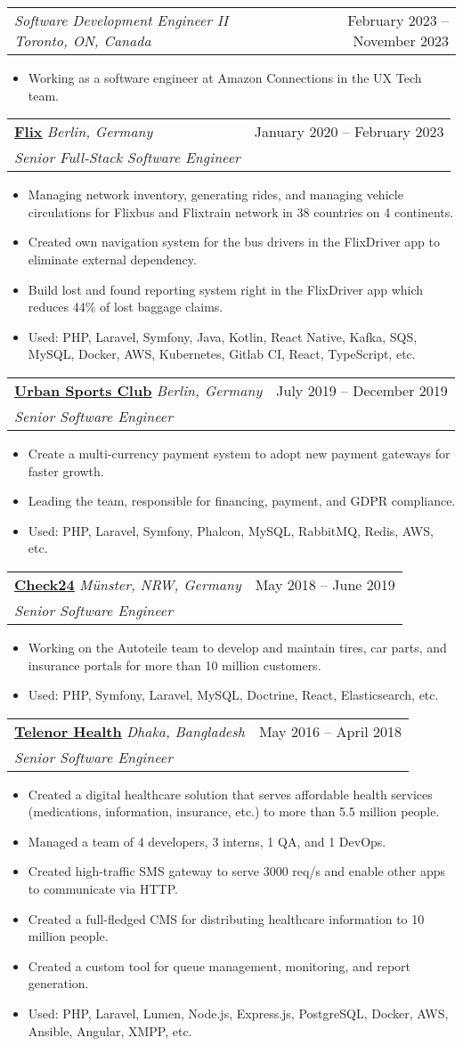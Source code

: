 \documentclass[a4paper,11pt]{article}
\makeatletter
\newcommand{\resumeItem}[1]{
  \item\small{
    {#1 \vspace{-2pt}}
  }
}
\newcommand{\resumeSubheading}[4]{
  \vspace{-2pt}\item
    \begin{tabular*}{0.97\textwidth}[t]{l@{\extracolsep{\fill}}r}
      \textbf{\large{#1}} \small{\textit{#4}} & #2 \\
      \textsl{#3}
    \end{tabular*}\vspace{-7pt}
}
\newcommand{\resumeSubSubheading}[2]{
    \vspace{-2pt}\item
    \begin{tabular*}{0.97\textwidth}{l@{\extracolsep{\fill}}r}
      \textsl{#1} & #2 \\
    \end{tabular*}\vspace{-7pt}
}
\newcommand{\resumeItemListStart}{\begin{itemize}}
\newcommand{\resumeItemListEnd}{\end{itemize}\vspace{-5pt}}
\makeatother
\begin{document}
      \resumeSubSubheading
        {Software Development Engineer II \small{\textit{Toronto, ON, Canada}}}{February 2023 -- November 2023}
        \resumeItemListStart
           \resumeItem{Working as a software engineer at Amazon Connections in the UX Tech team.}
        \resumeItemListEnd

    \resumeSubheading
      {\href{https://flix.com}{\underline{Flix}}} {January 2020 -- February 2023}
      {Senior Full-Stack Software Engineer}{Berlin, Germany}
      \resumeItemListStart
        \resumeItem{Managing network inventory, generating rides, and managing vehicle circulations for Flixbus and Flixtrain network in 38 countries on 4 continents.}
        \resumeItem{Created own navigation system for the bus drivers in the FlixDriver app to eliminate external dependency.}
        \resumeItem{Build lost and found reporting system right in the FlixDriver app which reduces 44\% of lost baggage claims.}
        \resumeItem{Used: PHP, Laravel, Symfony, Java, Kotlin, React Native, Kafka, SQS, MySQL, Docker, AWS, Kubernetes, Gitlab CI, React, TypeScript, etc.}
      \resumeItemListEnd
      
    \resumeSubheading
      {\href{https://urbansportsclub.com}{\underline{Urban Sports Club}}}{July 2019 -- December 2019}
      {Senior Software Engineer}{Berlin, Germany}
      \resumeItemListStart
        \resumeItem{Create a multi-currency payment system to adopt new payment gateways for faster growth.}
        \resumeItem{Leading the team, responsible for financing, payment, and GDPR compliance.}
        \resumeItem{Used: PHP, Laravel, Symfony, Phalcon, MySQL, RabbitMQ, Redis, AWS, etc.}
    \resumeItemListEnd

    \resumeSubheading
      {\href{http://check24.de}{\underline{Check24}}}{May 2018 -- June 2019}
      {Senior Software Engineer}{Münster, NRW, Germany}
      \resumeItemListStart
        \resumeItem{Working on the Autoteile team to develop and maintain tires, car parts, and insurance portals for more than 10 million customers.}
        \resumeItem{Used: PHP, Symfony, Laravel, MySQL, Doctrine, React, Elasticsearch, etc.}
      \resumeItemListEnd
      
    \resumeSubheading
      {\href{https://telenorhealth.com}{\underline{Telenor Health}}}{May 2016 -- April 2018}
      {Senior Software Engineer}{Dhaka, Bangladesh}
      \resumeItemListStart
        \resumeItem{Created a digital healthcare solution that serves affordable health services (medications, information, insurance, etc.) to more than 5.5 million people.}
        \resumeItem{Managed a team of 4 developers, 3 interns, 1 QA, and 1 DevOps.}
        \resumeItem{Created high-traffic SMS gateway to serve 3000 req/s and enable other apps to communicate via HTTP.}
        \resumeItem{Created a full-fledged CMS for distributing healthcare information to 10 million people.}
        \resumeItem{Created a custom tool for queue management, monitoring, and report generation.}
        \resumeItem{Used: PHP, Laravel, Lumen, Node.js, Express.js, PostgreSQL, Docker, AWS, Ansible, Angular, XMPP, etc.}
      \resumeItemListEnd
      
\end{document}
